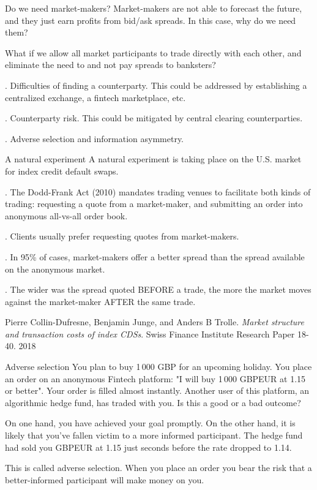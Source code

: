 \documentclass{beamer}
\begin{document}
\begin{frame}{Do we need market-makers?}
\justify
Market-makers are not able to forecast the future, and they just earn profits from bid/ask spreads. In this case, why do we need them?

\justify
What if we allow all market participants to trade directly with each other, and eliminate the need to and not pay spreads to banksters?

. Difficulties of finding a counterparty. This could be addressed by establishing a centralized exchange, a fintech marketplace, etc.

. Counterparty risk. This could be mitigated by central clearing counterparties.

. Adverse selection and information asymmetry.
\end{frame}



\begin{frame}{A natural experiment}
\justify
A natural experiment is taking place on the U.S. market for index credit default swaps.

. The Dodd-Frank Act (2010) mandates trading venues to facilitate both kinds of trading: requesting a quote from a market-maker, and submitting an order into anonymous all-vs-all order book.

. Clients usually prefer requesting quotes from market-makers.

. In 95\% of cases, market-makers offer a better spread than the spread available on the anonymous market.

. The wider was the spread quoted BEFORE a trade, the more the market moves against the market-maker AFTER the same trade.

\justify
\small{Pierre Collin-Dufresne, Benjamin Junge, and Anders B Trolle. \textit{Market structure and transaction costs of index CDSs}. Swiss Finance Institute Research Paper 18-40. 2018}
\end{frame}


\begin{frame}{Adverse selection}
\justify
You plan to buy 1\,000 GBP for an upcoming holiday. You place an order on an anonymous Fintech platform: "I will buy 1\,000 GBPEUR at 1.15 or better". Your order is filled almost instantly. Another user of this platform, an algorithmic hedge fund, has traded with you. Is this a good or a bad outcome?

\justify
On one hand, you have achieved your goal promptly. On the other hand, it is likely that you've fallen victim to a more informed participant. The hedge fund had sold you GBPEUR at 1.15 just seconds before the rate dropped to 1.14.

\justify
This is called \alert{adverse selection}. When you place an order you bear the risk that a better-informed participant will make money on you.
\end{frame}
\end{document}
